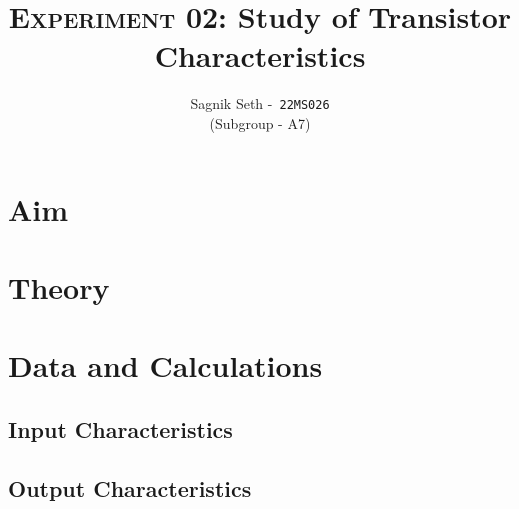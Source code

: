 \documentclass{scrartcl}
\title{
        \Large\textsc{Experiment 02: }
        \huge\textbf{Study of Transistor Characteristics} \\
}
\author{{\Large Sagnik Seth} -\   \texttt{22MS026}\\ ({\small Subgroup - A7}) }
\date{}
\begin{document}
\maketitle
\section{Aim}

\section{Theory}

\section{Data and Calculations}
\subsection{Input Characteristics}

\subsection{Output Characteristics}
\end{document}
